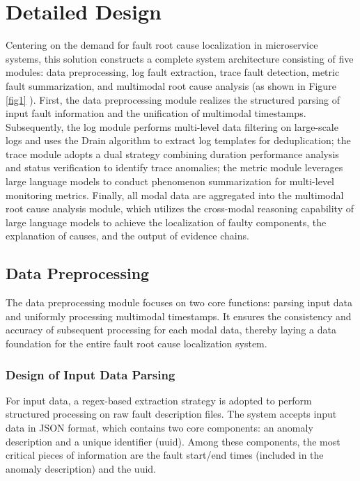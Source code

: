 \documentclass[10pt]{article}
\let\oldref\ref
\renewcommand{\ref}[1]{%
    \textcolor{blue}{\oldref{#1}}%
}
\begin{document}
\section{Detailed Design}
\label{sec:detail}

Centering on the demand for fault root cause localization in microservice systems, this solution constructs a complete system architecture consisting of five modules: data preprocessing, log fault extraction, trace fault detection, metric fault summarization, and multimodal root cause analysis (as shown in Figure \ref{fig1}). First, the data preprocessing module realizes the structured parsing of input fault information and the unification of multimodal timestamps. Subsequently, the log module performs multi-level data filtering on large-scale logs and uses the Drain algorithm to extract log templates for deduplication; the trace module adopts a dual strategy combining duration performance analysis and status verification to identify trace anomalies; the metric module leverages large language models to conduct phenomenon summarization for multi-level monitoring metrics. Finally, all modal data are aggregated into the multimodal root cause analysis module, which utilizes the cross-modal reasoning capability of large language models to achieve the localization of faulty components, the explanation of causes, and the output of evidence chains.


\subsection{Data Preprocessing}

The data preprocessing module focuses on two core functions: parsing input data and uniformly processing multimodal timestamps. It ensures the consistency and accuracy of subsequent processing for each modal data, thereby laying a data foundation for the entire fault root cause localization system.

\subsubsection{Design of Input Data Parsing}

For input data, a regex-based extraction strategy is adopted to perform structured processing on raw fault description files. The system accepts input data in JSON format, which contains two core components: an anomaly description and a unique identifier (uuid). Among these components, the most critical pieces of information are the fault start/end times (included in the anomaly description) and the uuid.
\end{document}
